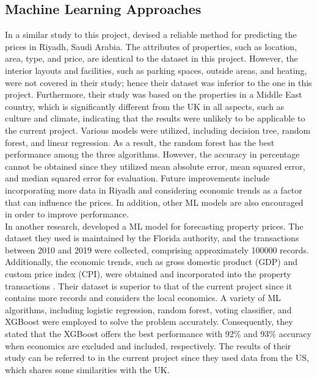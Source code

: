 \documentclass[12pt,twoside]{report}
\begin{document}
\subsection{Machine Learning Approaches}
In a similar study to this project, \citet{RN17} devised a reliable method for predicting the prices in Riyadh, Saudi Arabia. The attributes of properties, such as location, area, type, and price, are identical to the dataset in this project. However, the interior layouts and facilities, such as parking spaces, outside areas, and heating, were not covered in their study; hence their dataset was inferior to the one in this project. Furthermore, their study was based on the properties in a Middle East country, which is significantly different from the UK in all aspects, such as culture and climate, indicating that the results were unlikely to be applicable to the current project. Various models were utilized, including decision tree, random forest, and linear regression. As a result, the random forest has the best performance among the three algorithms. However, the accuracy in percentage cannot be obtained since they utilized mean absolute error, mean squared error, and median squared error for evaluation. Future improvements include incorporating more data in Riyadh and considering economic trends as a factor that can influence the prices. In addition, other ML models are also encouraged in order to improve performance. 
\\

In another research, \citet{RN20} developed a ML model for forecasting property prices. The dataset they used is maintained by the Florida authority, and the transactions between 2010 and 2019 were collected, comprising approximately 100000 records. Additionally, the economic trends, such as gross domestic product (GDP) and custom price index (CPI), were obtained and incorporated into the property transactions \cite{RN20}. Their dataset is superior to that of the current project since it contains more records and considers the local economics. A variety of ML algorithms, including logistic regression, random forest, voting classifier, and XGBoost were employed to solve the problem accurately. Consequently, they stated that the XGBoost offers the best performance with 92\% and 93\% accuracy when economics are excluded and included, respectively. The results of their study can be referred to in the current project since they used data from the US, which shares some similarities with the UK.
\\
\end{document}
